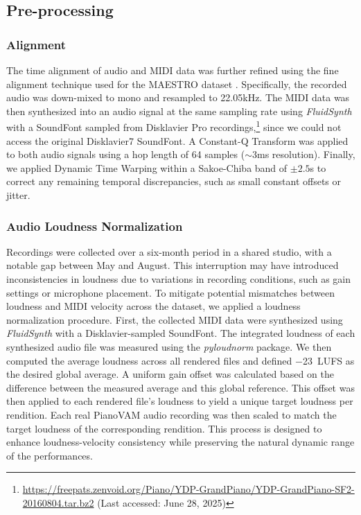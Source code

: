\documentclass{article}
\begin{document}
\subsection{Pre-processing}
\subsubsection{Alignment}\label{subsubsec:alignment}

The time alignment of audio and MIDI data was further refined using the fine alignment technique used for the MAESTRO dataset \cite{ICLR19Hawthorne}. 
Specifically, the recorded audio was down-mixed to mono and resampled to {22.05}\si{kHz}. 
The MIDI data was then synthesized into an audio signal at the same sampling rate using \textit{FluidSynth} with a SoundFont sampled from Disklavier Pro recordings,\footnote{\href{https://freepats.zenvoid.org/Piano/YDP-GrandPiano/YDP-GrandPiano-SF2-20160804.tar.bz2}{https://freepats.zenvoid.org/Piano/YDP-GrandPiano/YDP-GrandPiano-SF2-20160804.tar.bz2} (Last accessed: June 28, 2025)\label{soundfont}} since we could not access the original Disklavier7 SoundFont.
A Constant-Q Transform was applied to  both audio signals using a hop length of 64 samples ($\sim$3\si{ms} resolution). Finally, we applied Dynamic Time Warping within a Sakoe-Chiba band of $\pm2.5$\si{s} to correct any remaining temporal discrepancies, such as small constant offsets or jitter.


\subsubsection{Audio Loudness Normalization} 
Recordings were collected over a six-month period in a shared studio, with a notable gap between May and August. This interruption may have introduced inconsistencies in loudness due to variations in recording conditions, such as gain settings or microphone placement. To mitigate potential mismatches between loudness and MIDI velocity across the dataset, we applied a loudness normalization procedure. First, the collected MIDI data were synthesized using \textit{FluidSynth} with a Disklavier-sampled SoundFont. The integrated loudness of each synthesized audio file was measured using the \textit{pyloudnorm} package\cite{steinmetz2021pyloudnorm}. We then computed the average loudness across all rendered files and defined $-$23~\si{LUFS} as the desired global average. A uniform gain offset was calculated based on the difference between the measured average and this global reference. This offset was then applied to each rendered file's loudness to yield a unique target loudness per rendition. Each real PianoVAM audio recording was then scaled to match the target loudness of the corresponding rendition. This process is designed to enhance loudness-velocity consistency while preserving the natural dynamic range of the performances.
\end{document}
